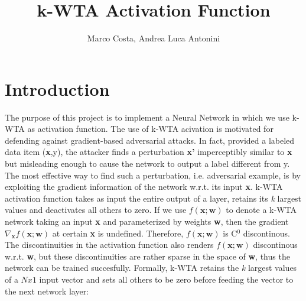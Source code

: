 \documentclass[a4paper]{article}
\title{k-WTA Activation Function}
\author{Marco Costa, Andrea Luca Antonini}
\begin{document}
	
	\maketitle
	
	\section{Introduction}
	The purpose of this project is to implement a Neural Network in which we use k-WTA as activation function. \newline
	The use of k-WTA acivation is motivated for defending against gradient-based adversarial attacks. In fact, provided a labeled data item (\textbf{x},y), the attacker finds a perturbation \textbf{x'} imperceptibly similar to \textbf{x} but misleading enough to cause the network to output a label different from y. The most effective way to find such a perturbation, i.e. adversarial example, is by exploiting the gradient information of the network w.r.t. its input \textbf{x}. \newline
	k-WTA activation function takes as input the entire output of a layer, retains its \textit{k} largest values and deactivates all others to zero. If we use $f(\textbf{x};\textbf{w})$ to denote a k-WTA network taking an input \textbf{x} and parameterized by weights \textbf{w}, then the gradient $\nabla_{\textbf{x}}f(\textbf{x};\textbf{w})$ at certain \textbf{x} is undefined. Therefore, $f(\textbf{x};\textbf{w})$ is C$^0$ discontinous. The discontinuities in the activation function also renders $f(\textbf{x};\textbf{w})$ discontinous w.r.t. \textbf{w}, but these discontinuities are rather sparse in the space of \textbf{w}, thus the network can be trained succesfully. \newline
	Formally, k-WTA retains the \textit{k} largest values of a $Nx1$ input vector and sets all others to be zero before feeding the vector to the next network layer:
	
\end{document}
